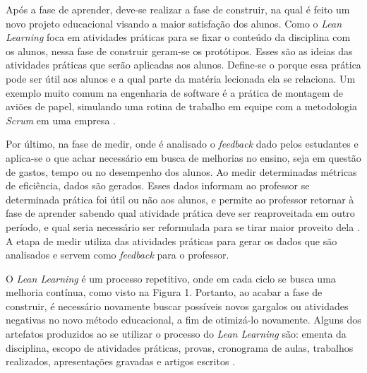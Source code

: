 Após a fase de aprender, deve-se realizar a fase de construir, na qual é feito um novo projeto educacional visando a maior satisfação dos alunos. Como o \textit{Lean Learning} foca em atividades práticas para se fixar o conteúdo da disciplina com os alunos, nessa fase de construir geram-se os protótipos. Esses são as ideias das atividades práticas que serão aplicadas aos alunos. Define-se o porque essa prática pode ser útil aos alunos e a qual parte da matéria lecionada ela se relaciona. Um exemplo muito comum na engenharia de software é a prática de montagem de aviões de papel, simulando uma rotina de trabalho em equipe com a metodologia \textit{Scrum} em uma empresa \cite{LeanStartup2016}.

Por último, na fase de medir, onde é analisado o \textit{feedback} dado pelos estudantes e aplica-se o que achar necessário em busca de melhorias no ensino, seja em questão de gastos, tempo ou no desempenho dos alunos. Ao medir determinadas métricas de eficiência, dados são gerados. Esses dados informam ao professor se determinada prática foi útil ou não aos alunos, e permite ao professor retornar à fase de aprender sabendo qual atividade prática deve ser reaproveitada em outro período, e qual seria necessário ser reformulada para se tirar maior proveito dela \cite{LeanStartup2016}. A etapa de medir utiliza das atividades práticas para gerar os dados que são analisados e servem como \textit{feedback} para o professor.

O \textit{Lean Learning} é um processo repetitivo, onde em cada ciclo se busca uma melhoria contínua, como visto na Figura 1. Portanto, ao acabar a fase de construir, é necessário novamente buscar possíveis novos gargalos ou atividades negativas no novo método educacional, a fim de otimizá-lo novamente. Alguns dos artefatos produzidos ao se utilizar o processo do \textit{Lean Learning} são: ementa da disciplina, escopo de atividades práticas, provas, cronograma de aulas, trabalhos realizados, apresentações gravadas e artigos escritos \cite{LeanStartup2016}.

